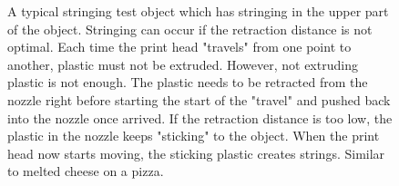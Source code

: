 \begin{figure}[!b]
\begin{minipage}[b]{0.45\textwidth}
    \caption{A typical stringing test object which has stringing in the upper part of the object. Stringing can occur if the retraction distance is not optimal. Each time the print head "travels" from one point to another, plastic must not be extruded. However, not extruding plastic is not enough. The plastic needs to be retracted from the nozzle right before starting the start of the "travel" and pushed back into the nozzle once arrived. If the retraction distance is too low, the plastic in the nozzle keeps "sticking" to the object. When the print head now starts moving, the sticking plastic creates strings. Similar to melted cheese on a pizza.}
    \label{figure/stringing}
  \end{minipage}
\end{figure}



